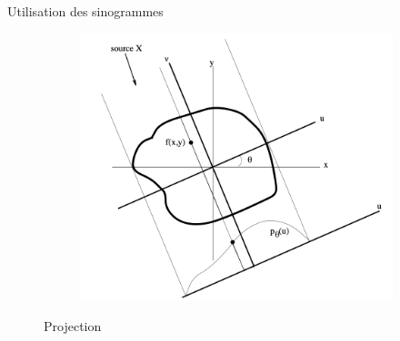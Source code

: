 \documentclass{beamer}
\begin{document}
\begin{frame}{Utilisation des sinogrammes}
\begin{figure}[t]
\begin{subfigure}[b]{0.42\textwidth}
            \includegraphics[width=\textwidth]{projection2.png}
        \end{subfigure}
        \caption{Projection}
    \end{figure}
\end{frame}
\end{document}
